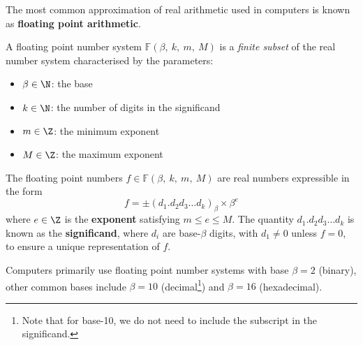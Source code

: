 \documentclass{article}
\begin{document}
The most common approximation of real arithmetic used in computers is known
as \textbf{floating point arithmetic}.
\begin{definition}
    A floating point number system \(\mathbb{F}\left( \beta,\: k,\: m,\: M \right)\)
    is a \textit{finite subset} of the real number system characterised by the parameters:
    \begin{itemize}
        \item \(\beta \in \N\): the base
        \item \(k \in \N\): the number of digits in the significand
        \item \(m \in \Z\): the minimum exponent
        \item \(M \in \Z\): the maximum exponent
    \end{itemize}
\end{definition}
\begin{definition}
    The floating point numbers \(f \in \mathbb{F}\left( \beta,\: k,\: m,\: M \right)\)
    are real numbers expressible in the form
    \begin{equation*}
        f = \pm \left( d_1.d_2 d_3 \dots d_k \right)_\beta \times \beta^e
    \end{equation*}
    where \(e \in \Z\) is the \textbf{exponent} satisfying \(m \leq e \leq M\).
    The quantity \(d_1.d_2 d_3 \dots d_k\) is known as the \textbf{significand},
    where \(d_i\) are base-\(\beta\) digits, with \(d_1 \neq 0\) unless \(f = 0\),
    to ensure a unique representation of \(f\).
\end{definition}
Computers primarily use floating point number systems with base \(\beta = 2\) (binary),
other common bases include \(\beta = 10\)
(decimal\footnote{Note that for base-10, we do not need to include the subscript in the significand.})
and \(\beta = 16\) (hexadecimal).
\end{document}
